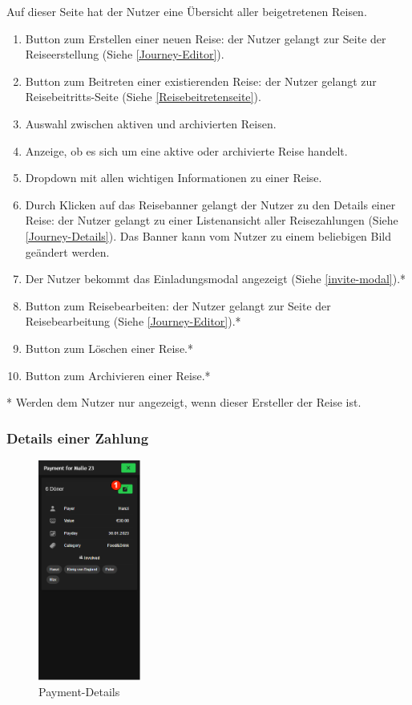 Auf dieser Seite hat der Nutzer eine Übersicht aller beigetretenen Reisen.

\begin{enumerate}[label=\protect\circled{\arabic*}]
	\item Button zum Erstellen einer neuen Reise: der Nutzer gelangt zur Seite der Reiseerstellung  (Siehe \ref{Journey-Editor}).
	\item Button zum Beitreten einer existierenden Reise: der Nutzer gelangt zur Reisebeitritts-Seite (Siehe \ref{Reisebeitretenseite}).
	\item Auswahl zwischen aktiven und archivierten Reisen.
	\item Anzeige, ob es sich um eine aktive oder archivierte Reise handelt.
	\item Dropdown mit allen wichtigen Informationen zu einer Reise.
	\item Durch Klicken auf das Reisebanner gelangt der Nutzer zu den Details einer Reise: der Nutzer gelangt zu einer Listenansicht aller Reisezahlungen  (Siehe \ref{Journey-Details}). Das Banner kann vom Nutzer zu einem beliebigen Bild geändert werden.
	\item Der Nutzer bekommt das Einladungsmodal angezeigt (Siehe \ref{invite-modal}).*
	\item Button zum Reisebearbeiten: der Nutzer gelangt zur Seite der Reisebearbeitung (Siehe \ref{Journey-Editor}).*
	\item Button zum Löschen einer Reise.*
	\item Button zum Archivieren einer Reise.*
\end{enumerate}
* Werden dem Nutzer nur angezeigt, wenn dieser Ersteller der Reise ist.
\subsubsection{Details einer Zahlung}\label{payment-details}
\begin{figure}[H]
	\centering
	\includegraphics[width=0.3\textwidth]{img/pages_numbers/payment-details.drawio}
	\caption[Payment-Details]{Payment-Details}
	\label{fig:payment-details}
\end{figure}

